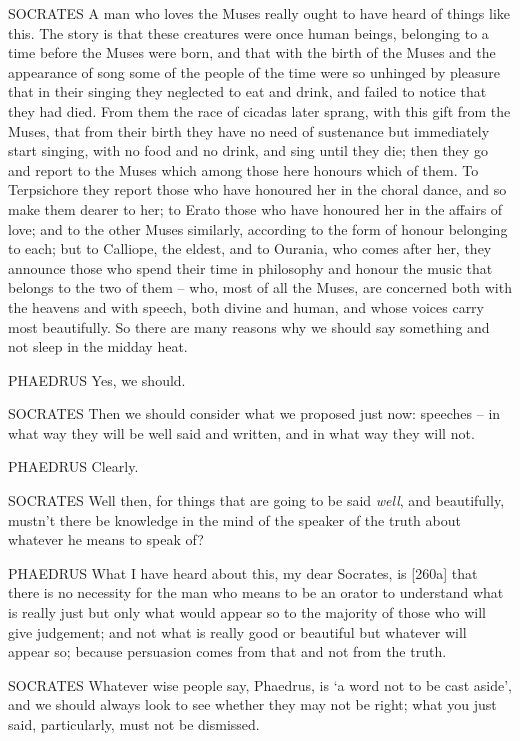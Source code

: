 SOCRATES A man who loves the Muses really ought to have  heard
of things like this. The story is that these creatures were once human
beings, belonging to a time before the Muses were born, and that with
the birth of the Muses and the appearance of song some of the people of
the time were so unhinged by pleasure that in their singing they
neglected to eat and drink,  and failed to notice that they had
died. From them the race of cicadas later sprang, with this gift from
the Muses, that from their birth they have no need of sustenance but
immediately start singing, with no food and no drink, and sing until
they  die; then they go and report to the Muses which among
those here honours which of them. To Terpsichore they report those who
have honoured her in the choral dance, and so make them  dearer
to her; to Erato those who have honoured her in the affairs of love; and
to the other Muses similarly, according to the form of honour belonging
to each; but to Calliope, the eldest, and to Ourania, who comes after
her, they announce those who spend their time in philosophy and honour
the music  that belongs to the two of them -- who, most of all
the Muses, are concerned both with the heavens and with
speech, both divine and
human, and whose voices carry most beautifully. So there are many
reasons why we should say something and not sleep in the midday heat.

PHAEDRUS Yes, we should.

 SOCRATES Then we should consider what we proposed just now:
speeches -- in what way they will be well said and written, and in what
way they will not.

PHAEDRUS Clearly.

SOCRATES Well then, for things that are going to be said {\em well}, and
beautifully, mustn't there be knowledge in the mind of the speaker of
the truth about whatever he means to speak of?

PHAEDRUS What I have heard about this, my dear Socrates, is {[}260a{]}
that there is no necessity for the man who means to be an orator to
understand what is really just but only what would appear so to the
majority of those who will give judgement; and not what is really good
or beautiful but whatever will appear so; because persuasion comes from
that and not from the truth.

 SOCRATES Whatever wise people say, Phaedrus, is ‘a word not to
be cast aside', and we
should always look to see whether they may not be right; what you just
said, particularly, must not be dismissed.

